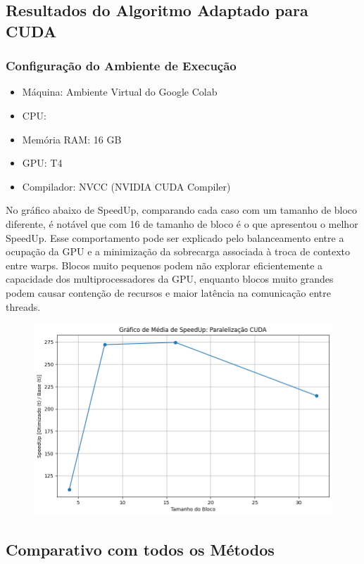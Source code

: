 \subsection{Resultados do Algoritmo Adaptado para CUDA}
\subsubsection{Configuração do Ambiente de Execução}
\begin{itemize}
    \item Máquina: Ambiente Virtual do Google Colab
    \item CPU:
    \item Memória RAM: 16 GB
    \item GPU: T4
    \item Compilador: NVCC (NVIDIA CUDA Compiler)
\end{itemize}

No gráfico abaixo de SpeedUp, comparando cada caso com um tamanho de bloco diferente, é notável que com 16 de tamanho de bloco é o que apresentou o melhor SpeedUp. Esse comportamento pode ser explicado pelo balanceamento entre a ocupação da GPU e a minimização da sobrecarga associada à troca de contexto entre warps. Blocos muito pequenos podem não explorar eficientemente a capacidade dos multiprocessadores da GPU, enquanto blocos muito grandes podem causar contenção de recursos e maior latência na comunicação entre threads.

\begin{figure}[H]
    \centering
    \includegraphics[width=1\linewidth]{../assets/CUDA - SpeedUp.png}
\end{figure}

\subsection{Comparativo com todos os Métodos}

